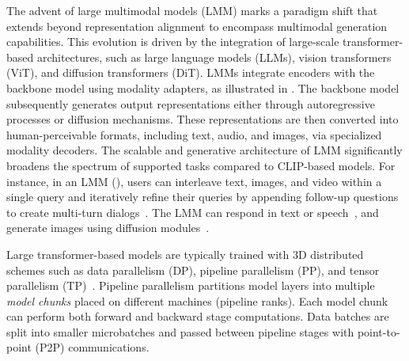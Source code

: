 The advent of large multimodal models (LMM) marks a paradigm shift that extends beyond representation alignment to encompass multimodal generation capabilities. This evolution is driven by the integration of large-scale transformer-based architectures, such as large language models (LLMs), vision transformers (ViT), and diffusion transformers (DiT).
LMMs integrate encoders with the backbone model using modality adapters, as illustrated in . The backbone model subsequently generates output representations either through autoregressive processes or diffusion mechanisms. These representations are then converted into human-perceivable formats, including text, audio, and images, via specialized modality decoders.
The scalable and generative architecture of LMM significantly broadens the spectrum of supported tasks compared to CLIP-based models.
For instance, in an LMM (), users can interleave text, images, and video within a single query and iteratively refine their queries by appending follow-up questions to create multi-turn dialogs~\cite{gpt4o-image-generation,gemini-3-2025,dialog-gen-arxiv24}.
The LMM can respond in text or speech~\cite{step-audio-arxiv25}, and generate images using diffusion modules~\cite{moviegen-arxiv24,step-t2v-arxiv25,hunyuan-dit-arxiv24}.

Large transformer-based models are typically trained with 3D distributed schemes such as data parallelism (DP), pipeline parallelism (PP), and tensor parallelism (TP)~\cite{megatron-lm-arxiv20}.
Pipeline parallelism partitions model layers into multiple \emph{model chunks} placed on different machines (\ie pipeline ranks).
Each model chunk can perform both forward and backward stage computations.
Data batches are split into smaller microbatches and passed between pipeline stages with point-to-point (P2P) communications.

